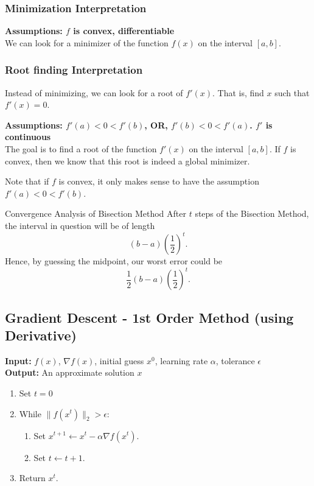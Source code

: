 \subsubsection{Minimization Interpretation}
\textbf{Assumptions: $f$ is convex, differentiable}\\

We can look for a minimizer of the function $f(x)$ on the interval $[a,b]$.


\subsubsection{Root finding Interpretation}
Instead of minimizing, we can look for a root of $f'(x)$.  That is, find $x$ such that $f'(x) = 0$.  

\textbf{Assumptions: $f'(a)<0 <  f'(b)$, OR, $f'(b) < 0 < f'(a)$.  $f'$ is continuous}\\
The goal is to find a root of the function $f'(x)$ on the interval $[a,b]$.  If $f$ is convex, then we know that this root is indeed a global minimizer.


Note that if $f$ is convex, it only makes sense to have the assumption $f'(a)<0 <  f'(b)$.






\begin{general}{Convergence Analysis of Bisection Method}{}
After $t$ steps of the Bisection Method, the interval in question will be of length
$$
(b-a)\left(\frac{1}{2}\right)^t.
$$
Hence, by guessing the midpoint, our worst error could be
$$
\frac{1}{2}(b-a)\left(\frac{1}{2}\right)^t.
$$
\end{general}

\subsection{Gradient Descent - 1st Order Method (using Derivative)}
\textbf{Input:} $f(x)$, $\nabla f(x)$, initial guess $x^0$, learning rate $\alpha$, tolerance $\epsilon$\\
\textbf{Output:} An approximate solution $x$

\begin{enumerate}
\item Set $t= 0$
\item While $\| f(x^t)\|_2 > \epsilon$:
\begin{enumerate}
\item Set $x^{t+1} \leftarrow x^t- \alpha \nabla f(x^t)$.
\item Set $t \leftarrow t+1$.
\end{enumerate}
\item Return $x^{t}$.
\end{enumerate}


